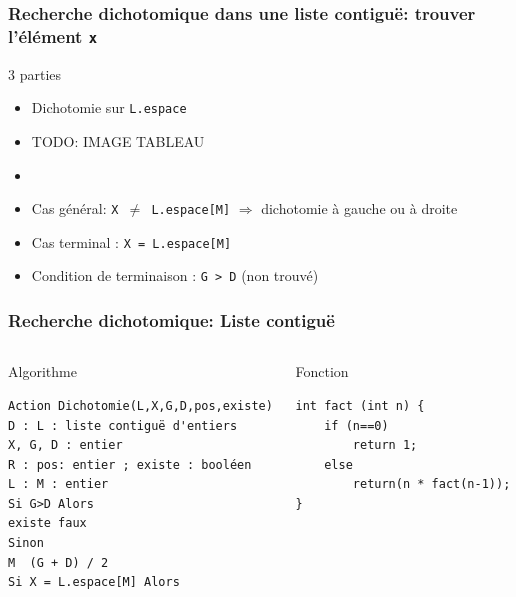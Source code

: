 \documentclass[table,handout,tikz,12pt,svgnames]{beamer}
\begin{document}
\begin{frame}[fragile=singleslide]
	\frametitle{Recherche dichotomique dans une liste contiguë: trouver l'élément \texttt{x}}
	\begin{block}{3 parties} %
		\begin{itemize}
			\item Dichotomie sur \texttt{L.espace}
			\item TODO: IMAGE TABLEAU
			\item
			\item Cas général: \texttt{X $\ne$ L.espace[M]}  $\Rightarrow$ dichotomie à gauche ou à droite
			\item Cas terminal : \texttt{X = L.espace[M]}
			\item Condition de terminaison : \texttt{G > D} (non trouvé)	
		\end{itemize}
	\end{block}
\end{frame}


\begin{frame}[fragile=singleslide]
	\frametitle{Recherche dichotomique: Liste contiguë}
				\begin{columns}[T]
				  	\hspace{-0.3cm}
				  	\begin{column}{0.5\textwidth}
				  	\begin{block}{Algorithme}
						\begin{verbatim}
Action Dichotomie(L,X,G,D,pos,existe)
D : L : liste contiguë d'entiers
X, G, D : entier
R : pos: entier ; existe : booléen
L : M : entier
Si G>D Alors
existe faux
Sinon
M  (G + D) / 2
Si X = L.espace[M] Alors
						\end{verbatim}		
					\end{block}			
					\end{column}
					\vrule{}
				  	\begin{column}{0.55\textwidth}
				  	\begin{block}{Fonction}
						\begin{verbatim}
int fact (int n) {
	if (n==0)
		return 1;
	else
		return(n * fact(n-1));
}
						\end{verbatim}					
					\end{block}	
					\end{column}
				\end{columns}
\end{frame}
\end{document}
